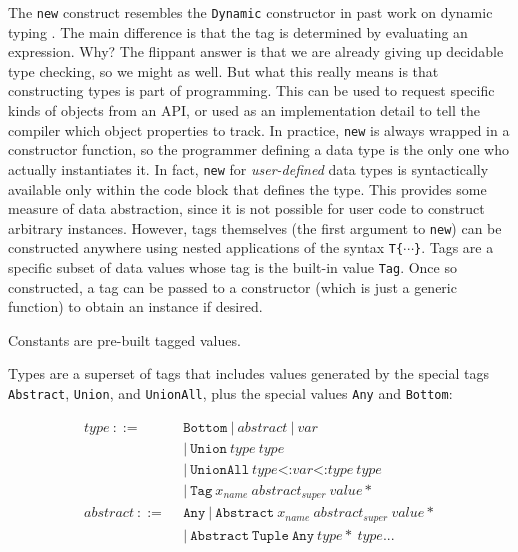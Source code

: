 The \texttt{new} construct resembles the \texttt{Dynamic} constructor
in past work on dynamic typing \cite{Abadi:1991:DTS:103135.103138}.
The main difference is that the tag is determined by evaluating an
expression.
Why? The flippant answer is that we are already giving up decidable
type checking, so we might as well.
But what this really means is that constructing types is part of programming.
This can be used to request specific kinds of objects from an API, or
used as an implementation detail to tell the compiler which object
properties to track.
In practice, \texttt{new} is always wrapped in a constructor function, so
the programmer defining a data type is the only one who actually instantiates
it.
In fact, \texttt{new} for \emph{user-defined} data types is syntactically
available only within the code block that defines the type.
This provides some measure of data abstraction, since it is not possible
for user code to construct arbitrary instances.
However, tags themselves (the first argument to \texttt{new}) can be
constructed anywhere using nested applications of the syntax
\texttt{T\{}$\cdots$\texttt{\}}.
Tags are a specific subset of data values whose tag is the built-in value
\texttt{Tag}.
Once so constructed, a tag can be passed to a constructor (which is just
a generic function) to obtain an instance if desired.

Constants are pre-built tagged values.

Types are a superset of tags that includes values generated by the
special tags \texttt{Abstract}, \texttt{Union}, and \texttt{UnionAll},
plus the special values \texttt{Any} and \texttt{Bottom}:

\vspace{-3ex}
\begin{singlespace}
\begin{align*}
  type\ ::=\ &\ \texttt{Bottom}\ |\ abstract\ |\ var \\
             &\ |\ \texttt{Union}\ type\ type \\
             &\ |\ \texttt{UnionAll}\ type\texttt{<:}var\texttt{<:}type\ type \\
             &\ |\ \texttt{Tag}\ x_{name}\ abstract_{super}\ value* \\
  abstract\ ::=\ &\ \texttt{Any}\ |\ \texttt{Abstract}\ x_{name}\ abstract_{super}\ value* \\
                 &\ |\ \texttt{Abstract}\ \texttt{Tuple}\ \texttt{Any}\ type*\ type\texttt{...}
\end{align*}
\end{singlespace}

